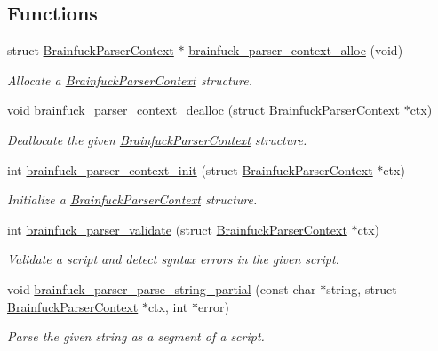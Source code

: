 \subsection*{Functions}
\begin{DoxyCompactItemize}
\item 
struct \hyperlink{structBrainfuckParserContext}{Brainfuck\+Parser\+Context} $\ast$ \hyperlink{group__parser_ga76d2c8f57c25c5be7d3f8212a4cefd45}{brainfuck\+\_\+parser\+\_\+context\+\_\+alloc} (void)
\begin{DoxyCompactList}\small\item\em Allocate a \hyperlink{structBrainfuckParserContext}{Brainfuck\+Parser\+Context} structure. \end{DoxyCompactList}\item 
void \hyperlink{group__parser_ga562074cdae7765d92eb4609bf564512b}{brainfuck\+\_\+parser\+\_\+context\+\_\+dealloc} (struct \hyperlink{structBrainfuckParserContext}{Brainfuck\+Parser\+Context} $\ast$ctx)
\begin{DoxyCompactList}\small\item\em Deallocate the given \hyperlink{structBrainfuckParserContext}{Brainfuck\+Parser\+Context} structure. \end{DoxyCompactList}\item 
int \hyperlink{group__parser_gaf20f40db8fd5915b6175ba8a0d16c5e0}{brainfuck\+\_\+parser\+\_\+context\+\_\+init} (struct \hyperlink{structBrainfuckParserContext}{Brainfuck\+Parser\+Context} $\ast$ctx)
\begin{DoxyCompactList}\small\item\em Initialize a \hyperlink{structBrainfuckParserContext}{Brainfuck\+Parser\+Context} structure. \end{DoxyCompactList}\item 
int \hyperlink{group__parser_ga70017cd77e93ffa16c09b7e9d26ad0a6}{brainfuck\+\_\+parser\+\_\+validate} (struct \hyperlink{structBrainfuckParserContext}{Brainfuck\+Parser\+Context} $\ast$ctx)
\begin{DoxyCompactList}\small\item\em Validate a script and detect syntax errors in the given script. \end{DoxyCompactList}\item 
void \hyperlink{group__parser_ga8ae33803127e1c48ad3cddecaf381a77}{brainfuck\+\_\+parser\+\_\+parse\+\_\+string\+\_\+partial} (const char $\ast$string, struct \hyperlink{structBrainfuckParserContext}{Brainfuck\+Parser\+Context} $\ast$ctx, int $\ast$error)
\begin{DoxyCompactList}\small\item\em Parse the given string as a segment of a script. \end{DoxyCompactList}\item 

\end{DoxyCompactItemize}
